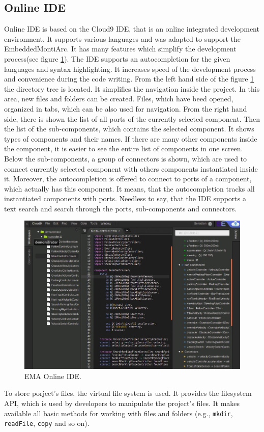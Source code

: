 \subsection{Online IDE} \label{sec:onlineide}
Online IDE is based on the Cloud9 IDE, that is an online integrated development environment. It supports various languages and was adapted to support the EmbeddedMontiArc. It has many features which simplify the development process(see figure \ref{fig:onlineIDE}). The IDE supports an autocompletion for the given languages and syntax highlighting. It increases speed of the development process and convenience during the code writing. From the left hand side of the figure \ref{fig:onlineIDE} the directory tree is located. It simplifies the navigation inside the project. In this area, new files and folders can be created. Files, which have beed opened, organized in tabs, which can be also used for navigation. From the right hand side, there is shown the list of all ports of the currently selected component. Then the list of the sub-components, which contains the selected component. It shows types of components and their names. If there are many other components inside the component, it is easier to see the entire list of components in one screen. Below the sub-components, a group of connectors is shown, which are used to connect currently selected component with others components instantiated inside it. Moreover, the autocompletion is offered to connect to ports of a component, which actually has this component. It means, that the autocompletion tracks all instantiated components with ports. Needless to say, that the IDE supports a text search and search through the ports, sub-components and connectors.
\begin{figure}[h!]
    \centering
    \includegraphics[width=\linewidth]{src/pic/onlineIDE}
    \caption{EMA Online IDE.}
    \label{fig:onlineIDE}
\end{figure} \newline
To store porject's files, the virtual file system \cite{VFS} is used. It provides the filesystem API, which is used by developers to manipulate the project's files. It makes available all basic methods for working with files and folders (e.g., \texttt{mkdir}, \texttt{readFile}, \texttt{copy} and so on).

